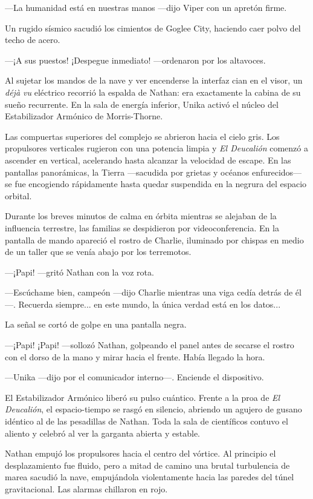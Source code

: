 \documentclass[11pt,twoside]{book}
\begin{document}
---La humanidad está en nuestras manos ---dijo Viper con un apretón firme.

Un rugido sísmico sacudió los cimientos de Goglee City, haciendo caer polvo del techo de acero.

---¡A sus puestos! ¡Despegue inmediato! ---ordenaron por los altavoces.

Al sujetar los mandos de la nave y ver encenderse la interfaz cian en el visor, un \textit{déjà vu} eléctrico recorrió la espalda de Nathan: era exactamente la cabina de su sueño recurrente. En la sala de energía inferior, Unika activó el núcleo del Estabilizador Armónico de Morris-Thorne.

Las compuertas superiores del complejo se abrieron hacia el cielo gris. Los propulsores verticales rugieron con una potencia limpia y \textit{El Deucalión} comenzó a ascender en vertical, acelerando hasta alcanzar la velocidad de escape. En las pantallas panorámicas, la Tierra ---sacudida por grietas y océanos enfurecidos--- se fue encogiendo rápidamente hasta quedar suspendida en la negrura del espacio orbital.

Durante los breves minutos de calma en órbita mientras se alejaban de la influencia terrestre, las familias se despidieron por videoconferencia. En la pantalla de mando apareció el rostro de Charlie, iluminado por chispas en medio de un taller que se venía abajo por los terremotos.

---¡Papi! ---gritó Nathan con la voz rota.

---Escúchame bien, campeón ---dijo Charlie mientras una viga cedía detrás de él---. Recuerda siempre... en este mundo, la única verdad está en los datos...

La señal se cortó de golpe en una pantalla negra.

---¡Papi! ¡Papi! ---sollozó Nathan, golpeando el panel antes de secarse el rostro con el dorso de la mano y mirar hacia el frente. Había llegado la hora.

---Unika ---dijo por el comunicador interno---. Enciende el dispositivo.

El Estabilizador Armónico liberó su pulso cuántico. Frente a la proa de \textit{El Deucalión}, el espacio-tiempo se rasgó en silencio, abriendo un agujero de gusano idéntico al de las pesadillas de Nathan. Toda la sala de científicos contuvo el aliento y celebró al ver la garganta abierta y estable.

Nathan empujó los propulsores hacia el centro del vórtice. Al principio el desplazamiento fue fluido, pero a mitad de camino una brutal turbulencia de marea sacudió la nave, empujándola violentamente hacia las paredes del túnel gravitacional. Las alarmas chillaron en rojo.
\end{document}
